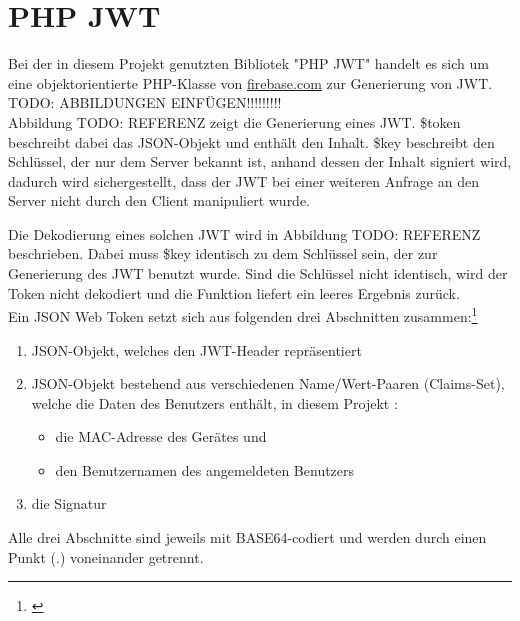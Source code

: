 \chapter{\ac{PHP} \ac{JWT}}
\label{cha:jwt}
\sloppy

Bei der in diesem Projekt genutzten Bibliotek "PHP JWT" handelt es sich um eine objektorientierte \ac{PHP}-Klasse von \mbox{\url{firebase.com}} zur Generierung von \acl{JWT}.\\

\fussy
TODO: ABBILDUNGEN EINFÜGEN!!!!!!!!!\\

Abbildung TODO: REFERENZ zeigt die Generierung eines \ac{JWT}. \$token beschreibt dabei das \ac{JSON}-Objekt und enthält den Inhalt. \$key beschreibt den Schlüssel, der nur dem Server bekannt ist, anhand dessen der Inhalt signiert wird, dadurch wird sichergestellt, dass der \ac{JWT} bei einer weiteren Anfrage an den Server nicht durch den Client manipuliert wurde.

Die Dekodierung eines solchen \acl{JWT} wird in Abbildung TODO: REFERENZ beschrieben. Dabei muss \$key identisch zu dem Schlüssel sein, der zur Generierung des \ac{JWT} benutzt wurde. Sind die Schlüssel nicht identisch, wird der Token nicht dekodiert und die Funktion liefert ein leeres Ergebnis zurück.\\

Ein \ac{JSON} Web Token setzt sich aus folgenden drei Abschnitten zusammen:\footnote{\citep[S. 289f.]{book_jwt}}
\begin{enumerate}
	\item JSON-Objekt, welches den \acs{JWT}-Header repräsentiert
	\item JSON-Objekt bestehend aus verschiedenen Name/Wert-Paaren (Claims-Set), welche die Daten des Benutzers enthält, in diesem Projekt \zB:
	\begin{itemize}
		\item die \acs{MAC}-Adresse des Gerätes und
		\item den Benutzernamen des angemeldeten Benutzers
	\end{itemize}
	\item die Signatur
\end{enumerate}
Alle drei Abschnitte sind jeweils mit BASE64-codiert und werden durch einen Punkt (.) voneinander getrennt.\\

